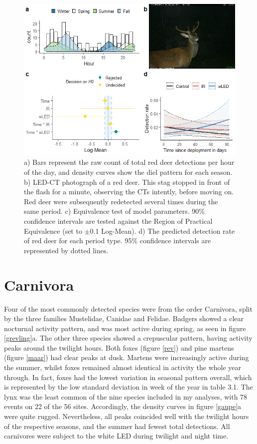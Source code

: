 \begin{figure}
		  \centering
	\includegraphics[width=13cm]{../R/glmm_sp_files/figure-html/hjort2-1.png}
\caption[Red deer]
{\footnotesize
	a) Bars represent the raw count of total red deer detections per hour of the day, and density curves show the diel pattern for each season.
	b) LED-CT photograph of a red deer. This stag stopped in front of the flash for a minute, observing the CTs intently, before moving on. Red deer were subsequently redetected several times during the same period.
	c) Equivalence test of model parameters. 90\% confidence intervals are tested against the Region of Practical Equivalence (set to $\pm$0.1 Log-Mean).
	d) The predicted detection rate of red deer for each period type. 95\% confidence intervals are represented by dotted lines.}
\label{hjort}
\end{figure}

\clearpage
\section{Carnivora}
Four of the most commonly detected species were from the order Carnivora, split by the three families Mustelidae, Canidae and Felidae. 
Badgers showed a clear nocturnal activity pattern, and was most active during spring, as seen in figure \ref{grevling}a. 
The other three species showed a crepuscular pattern, having activity peaks around the twilight hours.
Both foxes (figure \ref{rev}) and pine martens (figure \ref{maar}) had clear peaks at dusk. Martens were increasingly active during the summer, whilst foxes remained almost identical in activity the whole year through. In fact, foxes had the lowest variation in seasonal pattern overall, which is represented by the low standard deviation in week of the year in table 3.1.
The lynx was the least common of the nine species included in my analyses, with 78 events on 22 of the 56 sites. Accordingly, the density curves in figure \ref{gaupe}a were quite rugged. Nevertheless, all peaks coincided well with the twilight hours of the respective seasons, and the summer had fewest total detections.
All carnivores were subject to the white LED during twilight and night time.

